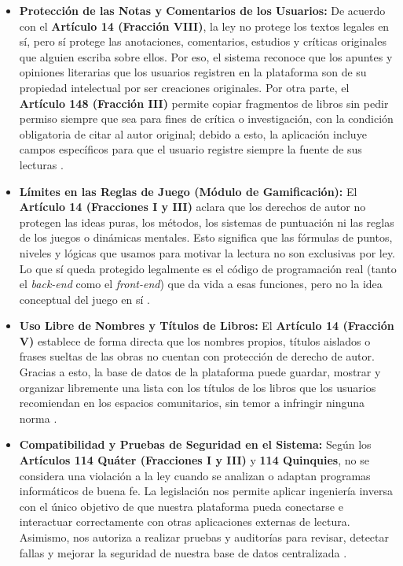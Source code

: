 \documentclass[12pt, atypical, journal]{article}
\begin{document}
\begin{itemize}
    
   \item \textbf{Protección de las Notas y Comentarios de los Usuarios:} De acuerdo con el \textbf{Artículo 14 (Fracción VIII)}, la ley no protege los textos legales en sí, pero sí protege las anotaciones, comentarios, estudios y críticas originales que alguien escriba sobre ellos. Por eso, el sistema reconoce que los apuntes y opiniones literarias que los usuarios registren en la plataforma son de su propiedad intelectual por ser creaciones originales. Por otra parte, el \textbf{Artículo 148 (Fracción III)} permite copiar fragmentos de libros sin pedir permiso siempre que sea para fines de crítica o investigación, con la condición obligatoria de citar al autor original; debido a esto, la aplicación incluye campos específicos para que el usuario registre siempre la fuente de sus lecturas \cite{lfda2026}.
    
    \item \textbf{Límites en las Reglas de Juego (Módulo de Gamificación):} El \textbf{Artículo 14 (Fracciones I y III)} aclara que los derechos de autor no protegen las ideas puras, los métodos, los sistemas de puntuación ni las reglas de los juegos o dinámicas mentales. Esto significa que las fórmulas de puntos, niveles y lógicas que usamos para motivar la lectura no son exclusivas por ley. Lo que sí queda protegido legalmente es el código de programación real (tanto el \textit{back-end} como el \textit{front-end}) que da vida a esas funciones, pero no la idea conceptual del juego en sí \cite{lfda2026}.
    
    \item \textbf{Uso Libre de Nombres y Títulos de Libros:} El \textbf{Artículo 14 (Fracción V)} establece de forma directa que los nombres propios, títulos aislados o frases sueltas de las obras no cuentan con protección de derecho de autor. Gracias a esto, la base de datos de la plataforma puede guardar, mostrar y organizar libremente una lista con los títulos de los libros que los usuarios recomiendan en los espacios comunitarios, sin temor a infringir ninguna norma \cite{lfda2026}.
    
    \item \textbf{Compatibilidad y Pruebas de Seguridad en el Sistema:} Según los \textbf{Artículos 114 Quáter (Fracciones I y III)} y \textbf{114 Quinquies}, no se considera una violación a la ley cuando se analizan o adaptan programas informáticos de buena fe. La legislación nos permite aplicar ingeniería inversa con el único objetivo de que nuestra plataforma pueda conectarse e interactuar correctamente con otras aplicaciones externas de lectura. Asimismo, nos autoriza a realizar pruebas y auditorías para revisar, detectar fallas y mejorar la seguridad de nuestra base de datos centralizada \cite{lfda2026}.
    

\end{itemize}
\end{document}
